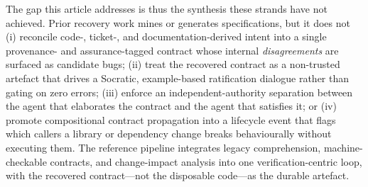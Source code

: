 The gap this article addresses is thus the synthesis these strands have not achieved. Prior recovery work mines or generates specifications, but it does not (i) reconcile code-, ticket-, and documentation-derived intent into a single provenance- and assurance-tagged contract whose internal \emph{disagreements} are surfaced as candidate bugs; (ii) treat the recovered contract as a non-trusted artefact that drives a Socratic, example-based ratification dialogue rather than gating on zero errors; (iii) enforce an independent-authority separation between the agent that elaborates the contract and the agent that satisfies it; or (iv) promote compositional contract propagation \cite{edmonds_article3} into a lifecycle event that flags which callers a library or dependency change breaks behaviourally without executing them. The reference pipeline integrates legacy comprehension, machine-checkable contracts, and change-impact analysis into one verification-centric loop, with the recovered contract---not the disposable code---as the durable artefact.
